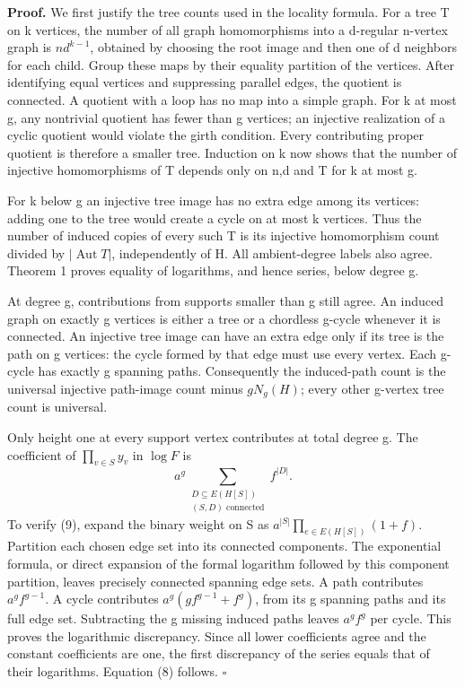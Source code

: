 \documentclass[
  11pt,
  a4paper,
]{article}
\begin{document}
\textbf{Proof.} We first justify the tree counts used in the locality
formula. For a tree T on k vertices, the number of all graph
homomorphisms into a d-regular n-vertex graph is \(nd^{k-1}\), obtained
by choosing the root image and then one of d neighbors for each child.
Group these maps by their equality partition of the vertices. After
identifying equal vertices and suppressing parallel edges, the quotient
is connected. A quotient with a loop has no map into a simple graph. For
k at most g, any nontrivial quotient has fewer than g vertices; an
injective realization of a cyclic quotient would violate the girth
condition. Every contributing proper quotient is therefore a smaller
tree. Induction on k now shows that the number of injective
homomorphisms of T depends only on n,d and T for k at most g.

For k below g an injective tree image has no extra edge among its
vertices: adding one to the tree would create a cycle on at most k
vertices. Thus the number of induced copies of every such T is its
injective homomorphism count divided by \(|\operatorname{Aut}T|\),
independently of H. All ambient-degree labels also agree. Theorem 1
proves equality of logarithms, and hence series, below degree g.

At degree g, contributions from supports smaller than g still agree. An
induced graph on exactly g vertices is either a tree or a chordless
g-cycle whenever it is connected. An injective tree image can have an
extra edge only if its tree is the path on g vertices: the cycle formed
by that edge must use every vertex. Each g-cycle has exactly g spanning
paths. Consequently the induced-path count is the universal injective
path-image count minus \(gN_g(H)\); every other g-vertex tree count is
universal.

Only height one at every support vertex contributes at total degree g.
The coefficient of \(\prod_{v\in S}y_v\) in \(\log F\) is \[
a^g\sum_{\substack{D\subseteq E(H[S])\\(S,D)\text{ connected}}}f^{|D|}.
\tag{9}
\] To verify (9), expand the binary weight on S as
\(a^{|S|}\prod_{e\in E(H[S])}(1+f)\). Partition each chosen edge set
into its connected components. The exponential formula, or direct
expansion of the formal logarithm followed by this component partition,
leaves precisely connected spanning edge sets. A path contributes
\(a^gf^{g-1}\). A cycle contributes \(a^g(gf^{g-1}+f^g)\), from its g
spanning paths and its full edge set. Subtracting the g missing induced
paths leaves \(a^gf^g\) per cycle. This proves the logarithmic
discrepancy. Since all lower coefficients agree and the constant
coefficients are one, the first discrepancy of the series equals that of
their logarithms. Equation (8) follows. \(\square\)
\end{document}
